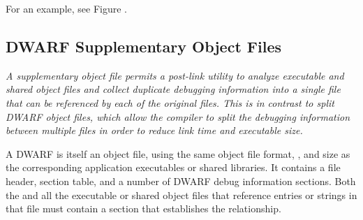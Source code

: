 For an example, see Figure .

\subsection{DWARF Supplementary Object Files}
\label{datarep:dwarfsupplemetaryobjectfiles}
\textit{A supplementary object file permits a post-link utility to analyze executable and
shared object files and collect duplicate debugging information into a single file that
can be referenced by each of the original files.  This is in contrast to split DWARF
object files, which allow the compiler to split the debugging information between
multiple files in order to reduce link time and executable size.}

A DWARF  is itself an object file, 
using the same object
file format, \byteorder{}, and size as the corresponding application 
executables or shared libraries. It 
\bb
contains
\eb
a file header, section table, and a number of DWARF debug information 
sections.  Both the 
and all the executable or shared object files that reference entries or 
strings in that file must contain a \dotdebugsup{} section that establishes 
the relationship.

